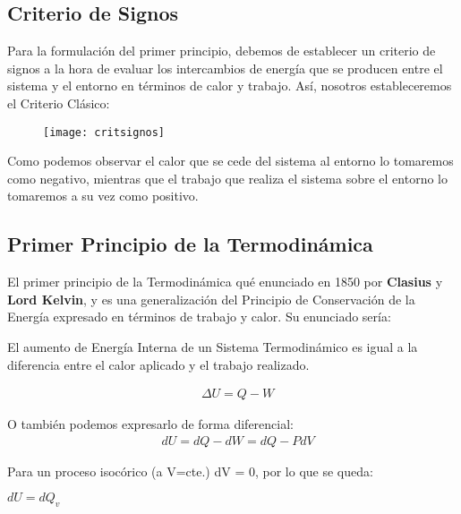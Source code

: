 \subsection{Criterio de Signos}

Para la formulación del primer principio, debemos de establecer un criterio de signos a la hora de evaluar los intercambios de energía que se producen entre el sistema y el entorno en términos de calor y trabajo. Así, nosotros estableceremos el Criterio Clásico:

\begin{figure}[h!]
	\centering
	\texttt{[image: critsignos]}
\end{figure}

Como podemos observar el calor que se cede del sistema al entorno lo tomaremos como negativo, mientras que el trabajo que realiza el sistema sobre el entorno lo tomaremos a su vez como positivo.

\subsection{Primer Principio de la Termodinámica}

El primer principio de la Termodinámica qué enunciado en 1850 por \textbf{Clasius} y \textbf{Lord Kelvin}, y es una generalización del Principio de Conservación de la Energía expresado en términos de trabajo y calor. Su enunciado sería:\\

\begin{definition}
	El aumento de Energía Interna de un Sistema Termodinámico es igual a la diferencia entre el calor aplicado y el trabajo realizado.
	
	\begin{align}
		& \Delta U = Q-W
	\end{align}

O también podemos expresarlo de forma diferencial:\\

	\begin{align}
		& dU = dQ - dW = dQ - PdV
	\end{align}
	
\end{definition}

Para un proceso isocórico (a V=cte.) dV = 0, por lo que se queda:\\

\begin{center}
	$dU = dQ_v$
\end{center}

